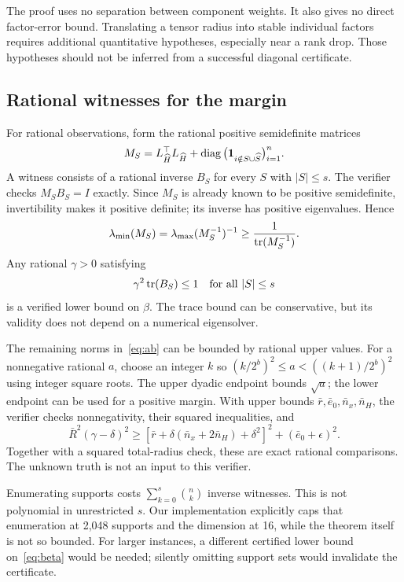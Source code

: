 The proof uses no separation between component weights. It also gives no direct factor-error bound. Translating a tensor radius into stable individual factors requires additional quantitative hypotheses, especially near a rank drop. Those hypotheses should not be inferred from a successful diagonal certificate.

\subsection{Rational witnesses for the margin}
For rational observations, form the rational positive semidefinite matrices
\begin{equation}\label{eq:restricted-gram}
 M_S=L_{\widehat H}^\top L_{\widehat H}
       +\operatorname{diag}\big(\mathbf 1_{i\notin S\cup\widehat S}\big)_{i=1}^n.
\end{equation}
A witness consists of a rational inverse $B_S$ for every $S$ with $|S|\le s$. The verifier checks $M_SB_S=I$ exactly. Since $M_S$ is already known to be positive semidefinite, invertibility makes it positive definite; its inverse has positive eigenvalues. Hence
\begin{equation}\label{eq:trace-bound}
 \lambda_{\min}(M_S)
 =\lambda_{\max}(M_S^{-1})^{-1}
 \ge\frac{1}{\operatorname{tr}(M_S^{-1})}.
\end{equation}
Any rational $\gamma>0$ satisfying
\begin{equation}\label{eq:gamma-cert}
 \gamma^2\operatorname{tr}(B_S)\le1\quad\text{for all }|S|\le s
\end{equation}
is a verified lower bound on $\beta$. The trace bound can be conservative, but its validity does not depend on a numerical eigensolver.

The remaining norms in~\eqref{eq:ab} can be bounded by rational upper values. For a nonnegative rational $a$, choose an integer $k$ so $(k/2^b)^2\le a<((k+1)/2^b)^2$ using integer square roots. The upper dyadic endpoint bounds $\sqrt a$; the lower endpoint can be used for a positive margin. With upper bounds $\bar r,\bar e_0,\bar n_x,\bar n_H$, the verifier checks nonnegativity, their squared inequalities, and
\begin{equation}\label{eq:radius-check}
 \bar R^2(\gamma-\delta)^2\ge
 [\bar r+\delta(\bar n_x+2\bar n_H)+\delta^2]^2
 +(\bar e_0+\epsilon)^2.
\end{equation}
Together with a squared total-radius check, these are exact rational comparisons. The unknown truth is not an input to this verifier.

Enumerating supports costs $\sum_{k=0}^s\binom nk$ inverse witnesses. This is not polynomial in unrestricted $s$. Our implementation explicitly caps that enumeration at 2,048 supports and the dimension at 16, while the theorem itself is not so bounded. For larger instances, a different certified lower bound on~\eqref{eq:beta} would be needed; silently omitting support sets would invalidate the certificate.


